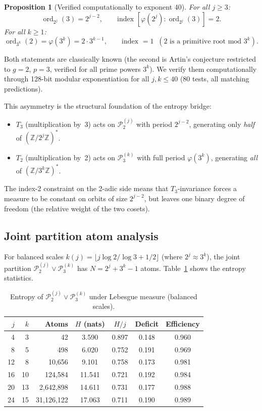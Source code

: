 \documentclass[11pt,a4paper]{article}
\newtheorem{proposition}{Proposition}
\DeclareMathOperator{\ord}{ord}
\begin{document}
\begin{proposition}[Verified computationally to exponent 40]
\label{prop:orders}
For all $j \geq 3$:
\[
\ord_{2^j}(3) = 2^{j-2}, \qquad
\text{index } [\varphi(2^j) : \ord_{2^j}(3)] = 2.
\]
For all $k \geq 1$:
\[
\ord_{3^k}(2) = \varphi(3^k) = 2 \cdot 3^{k-1}, \qquad
\text{index } = 1 \;\; (\text{2 is a primitive root mod } 3^k).
\]
\end{proposition}

Both statements are classically known
(the second is Artin's conjecture restricted to $g = 2$, $p = 3$,
verified for all prime powers $3^k$).
We verify them computationally through 128-bit modular exponentiation
for all $j, k \leq 40$ (80 tests, all matching predictions).

This asymmetry is the structural foundation of the entropy bridge:
\begin{itemize}
\item $T_3$ (multiplication by~3) acts on $\mathcal{P}_2^{(j)}$ with
  period $2^{j-2}$, generating only \emph{half} of $(\mathbb{Z}/2^j\mathbb{Z})^*$.
\item $T_2$ (multiplication by~2) acts on $\mathcal{P}_3^{(k)}$ with
  full period $\varphi(3^k)$, generating \emph{all} of $(\mathbb{Z}/3^k\mathbb{Z})^*$.
\end{itemize}
The index-2 constraint on the 2-adic side means that $T_3$-invariance
forces a measure to be constant on orbits of size $2^{j-2}$,
but leaves one binary degree of freedom (the relative weight of the
two cosets).

\subsection{Joint partition atom analysis}

For balanced scales $k(j) = \lfloor j \log 2 / \log 3 + 1/2 \rfloor$
(where $2^j \approx 3^k$), the joint partition
$\mathcal{P}_2^{(j)} \vee \mathcal{P}_3^{(k)}$ has
$N = 2^j + 3^k - 1$ atoms.
Table~\ref{tab:entropy} shows the entropy statistics.

\begin{table}[h]
\centering
\caption{Entropy of $\mathcal{P}_2^{(j)} \vee \mathcal{P}_3^{(k)}$
  under Lebesgue measure (balanced scales).}
\label{tab:entropy}
\begin{tabular}{rrrcccc}
\toprule
$j$ & $k$ & Atoms & $H$ (nats) & $H/j$ & Deficit & Efficiency \\
\midrule
 4 &  3 &         42 &  3.590 & 0.897 & 0.148 & 0.960 \\
 8 &  5 &        498 &  6.020 & 0.752 & 0.191 & 0.969 \\
12 &  8 &     10,656 &  9.101 & 0.758 & 0.173 & 0.981 \\
16 & 10 &    124,584 & 11.541 & 0.721 & 0.192 & 0.984 \\
20 & 13 &  2,642,898 & 14.611 & 0.731 & 0.177 & 0.988 \\
24 & 15 & 31,126,122 & 17.063 & 0.711 & 0.190 & 0.989 \\
\bottomrule
\end{tabular}
\end{table}
\end{document}

